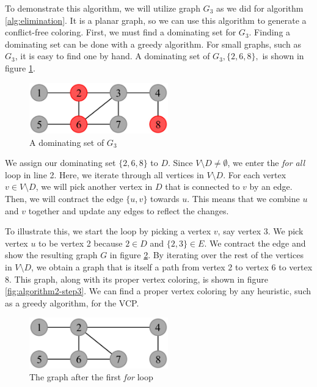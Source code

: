 \documentclass{sig-alternate}
\begin{document}
To demonstrate this algorithm, we will utilize graph $G_3$ as we did for algorithm \ref{alg:elimination}. It is a planar graph, so we can use this algorithm to generate a conflict-free coloring. First, we must find a dominating set for $G_3$. Finding a dominating set can be done with a greedy algorithm. For small graphs, such as $G_3$, it is easy to find one by hand. A dominating set of $G_3, \{2, 6, 8\},$ is shown in figure \ref{fig:algorithm2-step1}.

\begin{figure}[h]
	\centering
	\includegraphics[width=6cm]{../figures/algorithm2-step1.pdf}
	\caption{A dominating set of $G_3$}\label{fig:algorithm2-step1}
\end{figure}

We assign our dominating set $\{2,6,8\}$ to $D$. Since $V \setminus D \neq \emptyset$, we enter the \emph{for all} loop in line 2. Here, we iterate through all vertices in $V \setminus D$. For each vertex $v \in V \setminus D$, we will pick another vertex in $D$ that is connected to $v$ by an edge. Then, we will contract the edge $\{u, v\}$ towards $u$. This means that we combine $u$ and $v$ together and update any edges to reflect the changes.

To illustrate this, we start the loop by picking a vertex $v$, say vertex 3. We pick vertex $u$ to be vertex 2 because $2 \in D$ and $\{2, 3\} \in E$. We contract the edge and show the resulting graph $G$ in figure \ref{fig:algorithm2-step2}. By iterating over the rest of the vertices in $V \setminus D$, we obtain a graph that is itself a path from vertex 2 to vertex 6 to vertex 8. This graph, along with its proper vertex coloring, is shown in figure \ref{fig:algorithm2-step3}. We can find a proper vertex coloring by any heuristic, such as a greedy algorithm, for the VCP.

\begin{figure}[h]
	\centering
	\includegraphics[width=6cm]{../figures/algorithm2-step2.pdf}
	\caption{The graph after the first \emph{for} loop}\label{fig:algorithm2-step2}
\end{figure}
\end{document}
